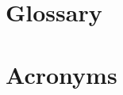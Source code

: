 
\begin{appendices}
\setcounter{table}{0}
\renewcommand{\thetable}{A\arabic{table}}
\renewcommand{\thesection}{\Roman{section}}
\section{Glossary}
\printglossary
\newpage
\section{Acronyms}
\printglossary[type=\acronymtype]
\newpage
\begin{landscape}

\end{landscape}
\end{appendices}
